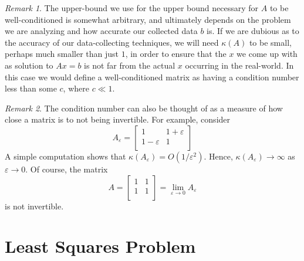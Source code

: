 \documentclass[12pt]{article}
\newcommand{\ee}{\varepsilon}
\theoremstyle{plain}
\theoremstyle{definition}
\theoremstyle{remark}
\newtheorem*{remark}{Remark}
\numberwithin{equation}{section}  %
\begin{document}
\begin{remark}
The upper-bound we use for the upper bound necessary for $A$ to be well-conditioned
is somewhat arbitrary, and ultimately depends on the problem we are analyzing
and how accurate our collected data $b$ is. If we are dubious as to 
the accuracy of our data-collecting techniques, we will 
need $\kappa(A)$ to be small,
perhaps much smaller than just $1$, in order to
ensure that the $x$ we come up with as solution to $Ax = b$ is not far
from the actual $x$ occurring in the real-world. In this case we would define
a well-conditioned matrix as having a condition number less than some $c$, where
$c \ll 1$. 
\end{remark}
\begin{remark}
The condition number can also be thought of as a measure of how close a matrix
is to not being invertible. For example, consider
\begin{equation*}
A_\ee = 
\begin{bmatrix}
1 & 1+ \ee \\
1 - \ee & 1 \\
\end{bmatrix}
\end{equation*}
A simple computation shows that $\kappa(A_\ee) = O(1/\ee^2)$.
Hence, $\kappa(A_\ee) \to \infty$ as $\ee \to 0$. Of course,
the matrix
\begin{equation*}
A = 
\begin{bmatrix}
1 & 1 \\
1  & 1 \\
\end{bmatrix}
 = \lim_{\ee \to 0} A_\ee
\end{equation*}
is not invertible.
\end{remark}
\section{Least Squares Problem}
\end{document}
